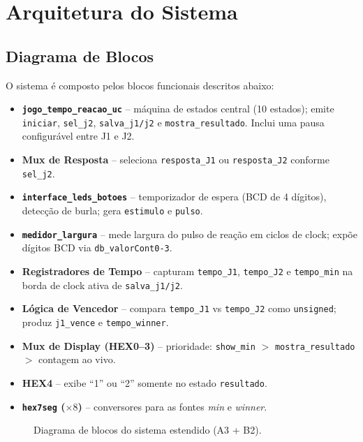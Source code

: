 \documentclass[12pt,a4paper]{article}
\begin{document}
\section{Arquitetura do Sistema}

\subsection{Diagrama de Blocos}

O sistema é composto pelos blocos funcionais descritos abaixo:

\begin{itemize}
    \item \textbf{\texttt{jogo\_tempo\_reacao\_uc}} -- máquina de estados
      central (10 estados); emite \texttt{iniciar}, \texttt{sel\_j2},
      \texttt{salva\_j1/j2} e \texttt{mostra\_resultado}. Inclui uma
      pausa configurável entre J1 e J2.
  \item \textbf{Mux de Resposta} -- seleciona \texttt{resposta\_J1} ou
        \texttt{resposta\_J2} conforme \texttt{sel\_j2}.
    \item \textbf{\texttt{interface\_leds\_botoes}} -- temporizador de espera
      (BCD de 4 dígitos), detecção de burla; gera \texttt{estimulo} e
      \texttt{pulso}.
  \item \textbf{\texttt{medidor\_largura}} -- mede largura do pulso de reação
        em ciclos de clock; expõe dígitos BCD via \texttt{db\_valorCont0-3}.
  \item \textbf{Registradores de Tempo} -- capturam \texttt{tempo\_J1},
        \texttt{tempo\_J2} e \texttt{tempo\_min} na borda de clock ativa de
        \texttt{salva\_j1/j2}.
  \item \textbf{Lógica de Vencedor} -- compara \texttt{tempo\_J1} vs
        \texttt{tempo\_J2} como \texttt{unsigned}; produz \texttt{j1\_vence}
        e \texttt{tempo\_winner}.
  \item \textbf{Mux de Display (HEX0--3)} -- prioridade: \texttt{show\_min}
        $>$ \texttt{mostra\_resultado} $>$ contagem ao vivo.
    \item \textbf{HEX4} -- exibe ``1'' ou ``2'' somente no estado
      \texttt{resultado}.
  \item \textbf{\texttt{hex7seg} ($\times 8$)} -- conversores para as fontes
        \textit{min} e \textit{winner}.
\end{itemize}

\begin{figure}[H]
  \centering
  \caption{Diagrama de blocos do sistema estendido (A3 + B2).}
  \label{fig:blocos}
\end{figure}
\end{document}
